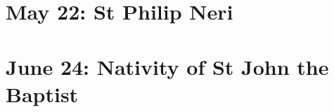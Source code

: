 {%
{
\section{May 22: St Philip Neri}
\subtitle{ Class (proper to the Oratory), White or Gold}
\subtitle{I \& II Vespers}

\def\definevesperspropers{
}
\def\definevesperspropersalt{
}
\def\vesperspropersnote{At II Vespers:}
\def\vesperspropersaltnote{At I Vespers:}
\def\premagverses{\greseteolcustos{manual}}

\medskip
{}

\bigskip{}
\benedicamusdomino{}
}

{
\section{June 24: Nativity of St John the Baptist}
\subtitle{ Class, White or Gold}
\subtitle{I \& II Vespers}

\def\definevesperspropers{
  \def\prepsalmfive{\greseteolcustos{manual}}
}
\def\definevesperspropersalt{}
\def\vesperspropersnote{At II Vespers:}
\def\vesperspropersaltnote{At I Vespers:}
\def\prevesperspsalms{\noindent\printnote{Chapter and following, page \pageref{june24-chapter}.\\}}
\def\vesperspsalmslabel{\label{june24-2vespers}}
\def\prevesperspsalmsalt{\noindent\printnote{II Vespers psalms and antiphons, page \pageref{june24-2vespers}.}\medskip}
\def\prechapter{\label{june24-chapter}}
\def\premagverses{\greseteolcustos{manual}}


}}
